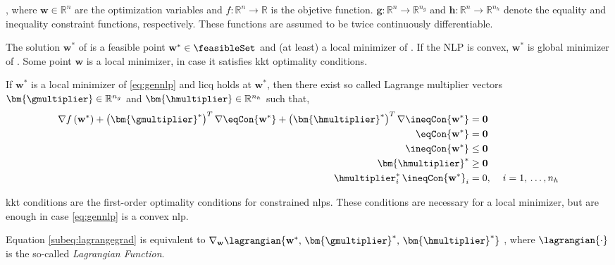 \noindent , where $\mathbf{w} \in \mathbb{R}^n$ are the optimization variables and $f:\mathbb{R}^n \to \mathbb{R}$ is the objetive function. $\mathbf{g}:\mathbb{R}^n \to \mathbb{R}^{n_g}$ and $\mathbf{h}:\mathbb{R}^n \to \mathbb{R}^{n_h}$ denote the equality and inequality constraint functions, respectively. These functions are assumed to be twice continuously differentiable.

The solution $\mathbf{w}^*$ of  is a feasible point $\mathbf{w}^* \in \feasibleSet$ and (at least) a local minimizer of . If the NLP is convex, $\mathbf{w}^*$ is global minimizer of . Some point $\mathbf{w}$ is a local minimizer, in case it satisfies \acrlong{kkt} optimality conditions.

\begin{theorem}
\label{theorem:kkt}
If $\mathbf{w}^*$ is a local minimizer of \ref{eq:gennlp} and \acrshort{licq} holds at $\mathbf{w}^*$, then there exist so called Lagrange multiplier vectors $\bm{\gmultiplier} \in \mathbb{R}^{n_g}$ and $\bm{\hmultiplier} \in \mathbb{R}^{n_h}$ such that,
\begin{subequations} \label{eq:kkt}
\begin{align}
\nabla f\left(\mathbf{w}^*\right) + \left(\bm{\gmultiplier}^*\right)^T \nabla\eqCon{\mathbf{w}^*} + \left( \bm{\hmultiplier}^* \right)^T \nabla\ineqCon{\mathbf{w}^*} &= \mathbf{0} \label{subeq:lagrangegrad} \\
\eqCon{\mathbf{w}^*} &= \mathbf{0} \label{subeq:eqcon}\\
\ineqCon{\mathbf{w}^*} &\leq \mathbf{0} \label{subeq:compcond1}\\
\bm{\hmultiplier}^* &\geq \mathbf{0} \label{subeq:compcond2}\\
\hmultiplier_i^* \, \ineqCon{\mathbf{w}^*}_i &= 0, \hspace{4mm} i = 1,\,\ldots,n_h \label{subeq:compcond3}
\end{align}
\end{subequations}
\end{theorem}

\acrshort{kkt} conditions are the first-order optimality conditions for constrained \acrshort{nlp}s. These conditions are necessary for a local minimizer, but are enough in case \ref{eq:gennlp} is a convex \acrshort{nlp}.

Equation \eqref{subeq:lagrangegrad} is equivalent to $\nabla_\mathbf{w} \lagrangian{\mathbf{w}^*,\,\bm{\gmultiplier}^*,\,\bm{\hmultiplier}^*}$ , where $\lagrangian{\cdot}$ is  the so-called \textit{Lagrangian Function}.

